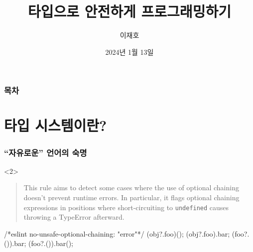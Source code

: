 \documentclass{beamer}
\title{타입으로 안전하게 프로그래밍하기}
\institute{SNULife 개발팀}
\date{2024년 1월 13일}
\author{이재호}
\begin{document}
\maketitle

\begin{frame}[c, fragile]
  \frametitle{목차}
  \tableofcontents[subsectionstyle=hide]
\end{frame}

\section{타입 시스템이란?}
\begin{frame}[c, fragile]
  \frametitle{``자유로운'' 언어의 숙명}


  \begin{onlyenv}<2>
    \begin{quote}
      This rule aims to detect some cases where the use of optional chaining doesn’t prevent runtime errors.
      In particular, it flags optional chaining expressions in positions where short-circuiting to \texttt{undefined} causes throwing a TypeError afterward.
    \end{quote}%
    \begin{jscode}
      /*eslint no-unsafe-optional-chaining: "error"*/
      (obj?.foo)();
      (obj?.foo).bar;
      (foo?.()).bar;
      (foo?.()).bar();
    \end{jscode}
  \end{onlyenv}


\end{frame}
\end{document}
